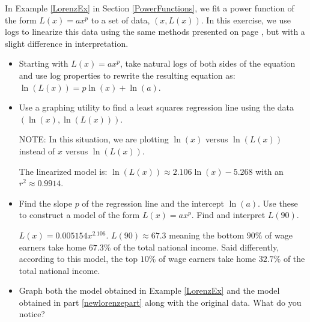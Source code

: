 \documentclass{ximera}
\begin{document}
\begin{problem}\label{LorenzExFollowUp}
    In Example \ref{LorenzEx} in Section \ref{PowerFunctions}, we fit a power function of the form $L(x) = a x^{p}$ to a set of data, $(x, L(x))$.  In this exercise, we use logs to linearize this data using the same methods presented on page \pageref{swineflulinearized}, but with a slight difference in interpretation.

\begin{itemize}
    \item 
    Starting with $L(x) = a x^{p}$, take natural logs of both sides of the equation and use log properties to rewrite the resulting equation as:  $\ln(L(x)) = p \ln(x) + \ln(a)$.  

\item 
    Use a graphing utility to find a least squares regression line using the data $(\ln(x), \ln(L(x)))$.   

NOTE:  In this situation, we are plotting $\ln(x)$ versus $\ln(L(x))$ instead of $x$ versus $\ln(L(x))$.  

\begin{solution}
The linearized model is: $\ln(L(x)) \approx 2.106 \ln(x) - 5.268$ with an $r^2 \approx  0.9914$.
\end{solution}

\item\label{newlorenzepart}
     Find the slope $p$ of the regression line and the intercept $\ln(a)$.  Use these to construct a model of the form $L(x) = a x^{p}$.   Find and interpret $L(90)$.

\begin{solution}
$L(x) = 0.005154 x^{2.106}$.  $L(90) \approx 67.3$ meaning the bottom $90 \%$ of wage earners take home $67.3 \%$ of the total national income.  Said differently, according to this model, the top $10 \%$ of wage earners take home $32.7 \%$ of the total national income.
\end{solution}

\item
    Graph both the model obtained in Example \ref{LorenzEx} and the model obtained in part \ref{newlorenzepart} along with the original data.  What do you notice?

\begin{solution}
\begin{center} 
\end{center}
\end{solution}
\end{itemize}
    
\end{problem}
\end{document}

